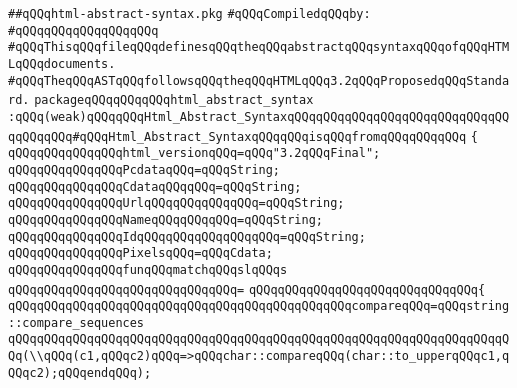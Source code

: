 \label{src/lib/html/html-abstract-syntax.pkg}
\verb|##qQQqhtml-abstract-syntax.pkg|\newline
\newline
\verb|#qQQqCompiledqQQqby:|\newline
\verb|#qQQqqQQqqQQqqQQqqQQq|\newline
\newline
\verb|#qQQqThisqQQqfileqQQqdefinesqQQqtheqQQqabstractqQQqsyntaxqQQqofqQQqHTMLqQQqdocuments.|\newline
\verb|#qQQqTheqQQqASTqQQqfollowsqQQqtheqQQqHTMLqQQq3.2qQQqProposedqQQqStandard.|\newline
\newline
\verb|packageqQQqqQQqqQQqhtml_abstract_syntax|\newline
\verb|:qQQq(weak)qQQqqQQqHtml_Abstract_SyntaxqQQqqQQqqQQqqQQqqQQqqQQqqQQqqQQqqQQqqQQq#qQQqHtml_Abstract_SyntaxqQQqqQQqisqQQqfromqQQqqQQqqQQq|\newline
\verb|{|\newline
\verb|qQQqqQQqqQQqqQQqhtml_versionqQQq=qQQq"3.2qQQqFinal";|\newline
\newline
\verb|qQQqqQQqqQQqqQQqPcdataqQQq=qQQqString;|\newline
\verb|qQQqqQQqqQQqqQQqCdataqQQqqQQq=qQQqString;|\newline
\verb|qQQqqQQqqQQqqQQqUrlqQQqqQQqqQQqqQQq=qQQqString;|\newline
\verb|qQQqqQQqqQQqqQQqNameqQQqqQQqqQQq=qQQqString;|\newline
\verb|qQQqqQQqqQQqqQQqIdqQQqqQQqqQQqqQQqqQQq=qQQqString;|\newline
\newline
\verb|qQQqqQQqqQQqqQQqPixelsqQQq=qQQqCdata;|\newline
\newline
\verb|qQQqqQQqqQQqqQQqfunqQQqmatchqQQqslqQQqs|\newline
\verb|qQQqqQQqqQQqqQQqqQQqqQQqqQQqqQQq=|\newline
\verb|qQQqqQQqqQQqqQQqqQQqqQQqqQQqqQQq{|\newline
\verb|qQQqqQQqqQQqqQQqqQQqqQQqqQQqqQQqqQQqqQQqqQQqqQQqcompareqQQq=qQQqstring::compare_sequences|\newline
\verb|qQQqqQQqqQQqqQQqqQQqqQQqqQQqqQQqqQQqqQQqqQQqqQQqqQQqqQQqqQQqqQQqqQQqqQQq(\\qQQq(c1,qQQqc2)qQQq=>qQQqchar::compareqQQq(char::to_upperqQQqc1,qQQqc2);qQQqendqQQq);|\newline
